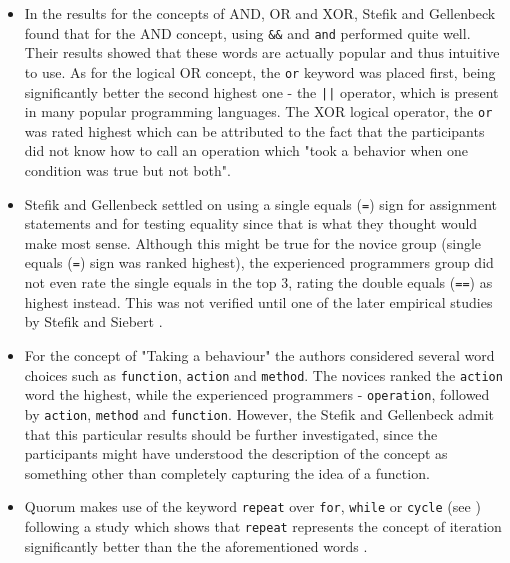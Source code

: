 \documentclass[preprint,10pt]{sigplanconf}
\begin{document}
\begin{itemize}
\item In the results for the concepts of AND, OR and XOR, Stefik and Gellenbeck \cite{EmpStudiesonStimuli} found that for the AND concept, using \lstinline!&&! and \lstinline!and! performed quite well. Their results showed that these words are actually popular and thus intuitive to use. As for the logical OR concept, the \lstinline!or! keyword was placed first, being significantly better the second highest one - the \lstinline!||! operator, which is present in many popular programming languages. The XOR logical operator, the \lstinline!or! was rated highest which can be attributed to the fact that the participants did not know how to call an operation which "took a behavior when one condition was true but not both".
\item Stefik and Gellenbeck \cite{EmpStudiesonStimuli} settled on using a single equals (\lstinline!=!) sign for assignment statements and for testing equality since that is what they thought would make most sense. Although this might be true for the novice group (single equals (\lstinline!=!) sign was ranked highest), the experienced programmers group did not even rate the single equals in the top 3, rating the double equals (\lstinline!==!) as highest instead. This was not verified until one of the later empirical studies by Stefik and Siebert \cite{Empiricalinvestigation}.
\item For the concept of "Taking a behaviour" the authors considered several word choices such as \lstinline!function!, \lstinline!action! and \lstinline!method!. The novices ranked the \lstinline!action! word the highest, while the experienced programmers - \lstinline!operation!, followed by \lstinline!action!, \lstinline!method! and \lstinline!function!. However, the Stefik and Gellenbeck admit that this particular results should be further investigated, since the participants might have understood the description of the concept as something other than completely capturing the idea of a function.
\item Quorum makes use of the keyword \lstinline!repeat! over \lstinline!for!, \lstinline!while! or \lstinline!cycle! (see %
\cite{SanchezData}) following a study which shows that \lstinline!repeat! represents the concept of iteration significantly better than the the aforementioned words \cite{EmpStudiesonStimuli}.
\end{itemize}
\end{document}
